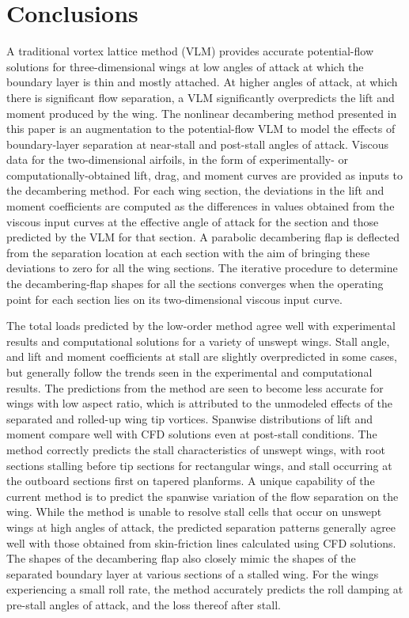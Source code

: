 \section{Conclusions}
\label{sec:ch2-summary}

A traditional vortex lattice method (VLM) provides accurate potential-flow solutions for three-dimensional wings at low angles of attack at which the boundary layer is thin and mostly attached. At higher angles of attack, at which there is significant flow separation, a VLM significantly overpredicts the lift and moment produced by the wing. The nonlinear decambering method presented in this paper is an augmentation to the potential-flow VLM to model the effects of boundary-layer separation at near-stall and post-stall angles of attack. Viscous data for the two-dimensional airfoils, in the form of experimentally- or computationally-obtained lift, drag, and moment curves are provided as inputs to the decambering method. For each wing section, the deviations in the lift and moment coefficients are computed as the differences in values obtained from the viscous input curves at the effective angle of attack for the section and those predicted by the VLM for that section. A parabolic decambering flap is deflected from the separation location at each section with the aim of bringing these deviations to zero for all the wing sections. The iterative procedure to determine the decambering-flap shapes for all the sections converges when the operating point for each section lies on its two-dimensional viscous input curve. 

The total loads predicted by the low-order method agree well with experimental results and computational solutions for a variety of unswept wings. Stall angle, and lift and moment coefficients at stall are slightly overpredicted in some cases, but generally follow the trends seen in the experimental and computational results. The predictions from the method are seen to become less accurate for wings with low aspect ratio, which is attributed to the unmodeled effects of the separated and rolled-up wing tip vortices. Spanwise distributions of lift and moment compare well with CFD solutions even at post-stall conditions. The method correctly predicts the stall characteristics of unswept wings, with root sections stalling before tip sections for rectangular wings, and stall occurring at the outboard sections first on tapered planforms. A unique capability of the current method is to predict the spanwise variation of the flow separation on the wing. While the method is unable to resolve stall cells that occur on unswept wings at high angles of attack, the predicted separation patterns generally agree well with those obtained from skin-friction lines calculated using CFD solutions. The shapes of the decambering flap also closely mimic the shapes of the separated boundary layer at various sections of a stalled wing. For the wings experiencing a small roll rate, the method accurately predicts the roll damping at pre-stall angles of attack, and the loss thereof after stall.

